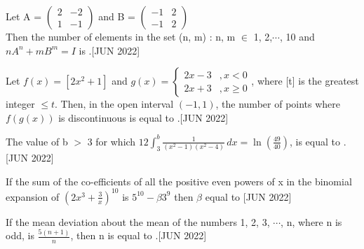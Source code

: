 \iffalse
  \title{Assignment}
  \author{ee24btech11030}
  \section{integer}
\fi

\item Let A = $\begin{pmatrix} 2 & -2 \\ 1 & -1 \end{pmatrix}$ and  B = $\begin{pmatrix} -1 & 2 \\ -1 & 2 \end{pmatrix}$\\
    Then the number of elements in the set {(n, m) : n, m $\in$ { 1, 2,$\cdots$, 10} and $nA^n + mB^m = I$} is \underline{\hspace{1cm}}.\hfill{[JUN 2022]}
    \bigskip
    
    \item Let $f(x) = [2x^2 + 1]$ and 
    $g(x) = \begin{cases} 
    2x - 3 & , x < 0 \\ 
    2x + 3 & , x \geq 0 
    \end{cases}$, where  [t] is the greatest integer $\leq t$. Then, in the open interval $(-1, 1)$, the number of points where $f(g(x))$ is discontinuous is equal to \underline{\hspace{1cm}}.\hfill{[JUN 2022]}
    \bigskip
    
    \item The value of b $>$ 3 for which $12\int_{3}^{b}\frac{1}{(x^2 - 1)(x^2 - 4)} \,dx = \ln{(\frac{49}{40})}$, is equal to \underline{\hspace{1cm}}.\hfill{[JUN 2022]}
    \bigskip
    
    \item If the sum of the co-efficients of all the positive even powers of x in the binomial expansion of $\left(2x^3 + \frac{3}{x}\right)^{10}$ is $5^{10} - {\beta}3^9$ then $\beta$ equal to \underline{\hspace{1cm}}\hfill{[JUN 2022]}
    \bigskip
    
    \item If the mean deviation about the mean of the numbers 1, 2, 3, $\cdots$, n, where n is odd, is $\frac{5(n+1)}{n}$, then n is equal to \underline{\hspace{1cm}}.\hfill{[JUN 2022]}
    \bigskip
    
